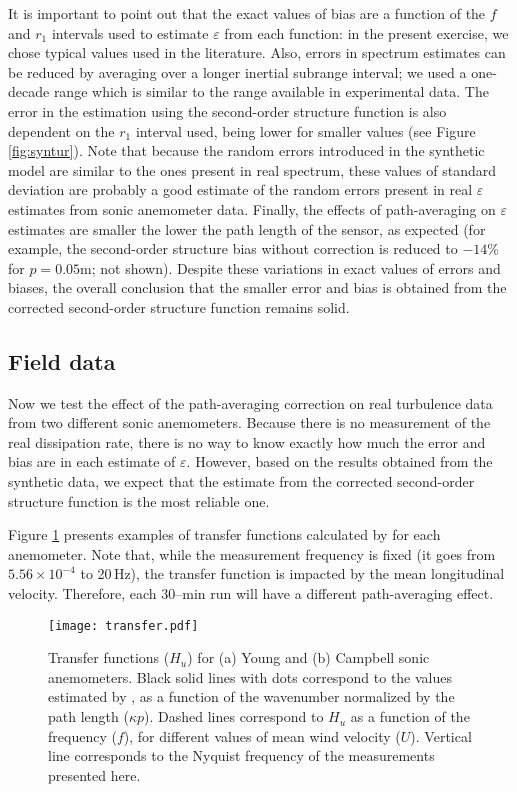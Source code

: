 \documentclass{svjour3}                     %
\begin{document}
It is important to point out that the exact values of bias are a
function of the $f$ and $r_1$ intervals used to estimate $\varepsilon$
from each function: in the present exercise, we chose typical values
used in the literature. Also, errors in spectrum estimates can be
reduced by averaging over a longer inertial subrange interval; we used
a one-decade range which is similar to the range available in
experimental data. The error in the estimation using the second-order
structure function is also dependent on the $r_1$ interval used, being
lower for smaller values (see Figure \ref{fig:syntur}). Note that
because the random errors introduced in the synthetic model are
similar to the ones present in real spectrum, these values of standard
deviation are probably a good estimate of the random errors present in
real $\varepsilon$ estimates from sonic anemometer data. Finally, the
effects of path-averaging on $\varepsilon$ estimates are smaller the
lower the path length of the sensor, as expected (for example, the
second-order structure bias without correction is reduced to $-14$\%
for $p = 0.05$m; not shown). Despite these variations in exact values
of errors and biases, the overall conclusion that the smaller error
and bias is obtained from the corrected second-order structure
function remains solid.

\subsection{Field data}

Now we test the effect of the path-averaging correction on real
turbulence data from two different sonic anemometers. Because there is
no measurement of the real dissipation rate, there is no way to know
exactly how much the error and bias are in each estimate of
$\varepsilon$. However, based on the results obtained from the
synthetic data, we expect that the estimate from the corrected
second-order structure function is the most reliable one.

Figure \ref{fig:transfer} presents examples of transfer functions
calculated by \citet{HorOnc2006} for each anemometer. Note that, while
the measurement frequency is fixed (it goes from $5.56\times 10^{-4}$
to 20\,Hz), the transfer function is impacted by the mean longitudinal
velocity. Therefore, each 30--min run will have a different
path-averaging effect.

\begin{figure}\centering
  \texttt{[image: transfer.pdf]}
  \caption{Transfer functions ($H_u$) for (a) Young and (b) Campbell
    sonic anemometers. Black solid lines with dots correspond to the
    values estimated by \citet{HorOnc2006}, as a function of the
    wavenumber normalized by the path length ($\kappa p$). Dashed
    lines correspond to $H_u$ as a function of the frequency ($f$),
    for different values of mean wind velocity ($U$). Vertical line
    corresponds to the Nyquist frequency of the measurements presented
    here. \label{fig:transfer}}
\end{figure}
\end{document}
